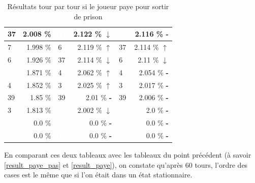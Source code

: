 \documentclass[letterpaper]{article}
\newcommand{\caseUp}[1][]{#1\textcolor[HTML]{008000}{$\mathbf{\uparrow}$}}
\newcommand{\caseStable}[1][]{#1\textcolor[HTML]{3779dd}{\textbf{-}}}
\newcommand{\caseDown}[1][]{#1\textcolor[HTML]{dd3737}{$\mathbf{\downarrow}$}}
\begin{document}
\begin{table}
\begin{tabular}{|l|r||l|r||l|r|}
	    \cellcolor[HTML]{FFC1C1} 37 & 2.008 \% & \cellcolor[HTML]{000000} \textcolor{white}{11} & 2.122 \% \caseDown[\hfill] & \cellcolor[HTML]{000000} \textcolor{white}{11} & 2.116 \% \caseStable[\hfill] \\ \hline
	    \cellcolor[HTML]{1E90FF}  7 & 1.998 \% & \cellcolor[HTML]{E6E6FA}  6 & 2.119 \% \caseUp[\hfill] & \cellcolor[HTML]{FFC1C1} 37 & 2.114 \% \caseUp[\hfill] \\ \hline
	    \cellcolor[HTML]{E6E6FA}  6 & 1.926 \% & \cellcolor[HTML]{FFC1C1} 37 & 2.114 \% \caseDown[\hfill] & \cellcolor[HTML]{E6E6FA} 6 & 2.11 \% \caseDown[\hfill] \\ \hline
	    \cellcolor[HTML]{483D8B} \textcolor{white}{38} & 1.871 \% & \cellcolor[HTML]{A0522D}  4 & 2.062 \% \caseUp[\hfill] & \cellcolor[HTML]{A0522D} 4 & 2.054 \% \caseStable[\hfill] \\ \hline
	    \cellcolor[HTML]{A0522D}  4 & 1.852 \% & \cellcolor[HTML]{EEEED1}  3 & 2.025 \% \caseUp[\hfill] & \cellcolor[HTML]{EEEED1} 3 & 2.017 \% \caseStable[\hfill] \\ \hline
	    \cellcolor[HTML]{8B1A1A} 39 & 1.85 \%  & \cellcolor[HTML]{8B1A1A} 39 & 2.01 \% \caseStable[\hfill] & \cellcolor[HTML]{8B1A1A} 39 & 2.006 \% \caseStable[\hfill] \\ \hline
	    \cellcolor[HTML]{EEEED1}  3 & 1.813 \% & \cellcolor[HTML]{483D8B} \textcolor{white}{38} & 2.002 \% \caseDown[\hfill] & \cellcolor[HTML]{483D8B} \textcolor{white}{38} & 2.0 \% \caseStable[\hfill] \\ \hline
	    \cellcolor[HTML]{000000} \textcolor{white}{42} & 0.0 \%   & \cellcolor[HTML]{000000} \textcolor{white}{42} & 0.0 \% \caseStable[\hfill] & \cellcolor[HTML]{000000} \textcolor{white}{42} & 0.0 \% \caseStable[\hfill] \\ \hline
	    \cellcolor[HTML]{000000} \textcolor{white}{43} & 0.0 \%   & \cellcolor[HTML]{000000} \textcolor{white}{43} & 0.0 \% \caseStable[\hfill] & \cellcolor[HTML]{000000} \textcolor{white}{43} & 0.0 \% \caseStable[\hfill] \\ \hline
	\end{tabular}
	\caption{Résultats tour par tour si le joueur paye pour
	sortir de prison}
	\label{result_tour_paye}
      \end{table}

      En comparant ces deux tableaux avec les tableaux du point précédent
      (à savoir \ref{result_paye_pas} et \ref{result_paye}), on constate
      qu'après 60 tours, l'ordre des cases est le même que si l'on était
      dans un état stationnaire.
\end{document}
